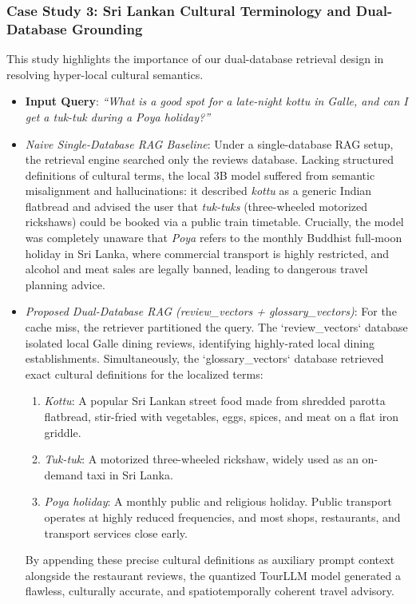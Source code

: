 \documentclass{ieeeaccess}
\begin{document}
\subsubsection{Case Study 3: Sri Lankan Cultural Terminology and Dual-Database Grounding}
This study highlights the importance of our dual-database retrieval design in resolving hyper-local cultural semantics.
\begin{itemize}
    \item \textbf{Input Query}: \emph{``What is a good spot for a late-night kottu in Galle, and can I get a tuk-tuk during a Poya holiday?''}
    \item \emph{Naive Single-Database RAG Baseline}: Under a single-database RAG setup, the retrieval engine searched only the reviews database. Lacking structured definitions of cultural terms, the local 3B model suffered from semantic misalignment and hallucinations: it described \emph{kottu} as a generic Indian flatbread and advised the user that \emph{tuk-tuks} (three-wheeled motorized rickshaws) could be booked via a public train timetable. Crucially, the model was completely unaware that \emph{Poya} refers to the monthly Buddhist full-moon holiday in Sri Lanka, where commercial transport is highly restricted, and alcohol and meat sales are legally banned, leading to dangerous travel planning advice.
    \item \emph{Proposed Dual-Database RAG (review\_vectors + glossary\_vectors)}: For the cache miss, the retriever partitioned the query. The `review\_vectors` database isolated local Galle dining reviews, identifying highly-rated local dining establishments. Simultaneously, the `glossary\_vectors` database retrieved exact cultural definitions for the localized terms:
    \begin{enumerate}
        \item \emph{Kottu}: A popular Sri Lankan street food made from shredded parotta flatbread, stir-fried with vegetables, eggs, spices, and meat on a flat iron griddle.
        \item \emph{Tuk-tuk}: A motorized three-wheeled rickshaw, widely used as an on-demand taxi in Sri Lanka.
        \item \emph{Poya holiday}: A monthly public and religious holiday. Public transport operates at highly reduced frequencies, and most shops, restaurants, and transport services close early.
    \end{enumerate}
    By appending these precise cultural definitions as auxiliary prompt context alongside the restaurant reviews, the quantized TourLLM model generated a flawless, culturally accurate, and spatiotemporally coherent travel advisory.
\end{itemize}
\end{document}
